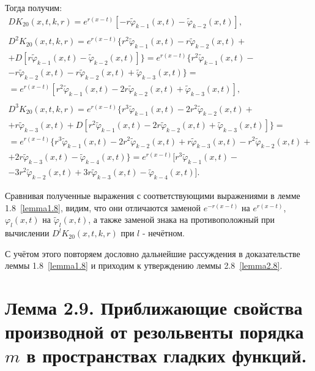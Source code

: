 Тогда получим:
\begin{equation}
\begin{array}{c}
\nonumber

DK_{20}(x,t,k,r) = e^{r(x-t)}[-r\widetilde\varphi_{k-1}(x,t) - \widetilde\varphi_{k-2}(x,t)], \\\\
D^2K_{20}(x,t,k,r) = e^{r(x-t)}\lbrace r^2\widetilde\varphi_{k-1}(x,t)-r\widetilde\varphi_{k-2}(x,t) + \\ + D[r\widetilde\varphi_{k-1}(x,t) - \widetilde\varphi_{k-2}(x,t)]\rbrace = e^{r(x-t)}\lbrace r^2\widetilde\varphi_{k-1}(x,t) - \\ - r\widetilde\varphi_{k-2}(x,t) - r\widetilde\varphi_{k-2}(x,t) + \widetilde\varphi_{k-3}(x,t)\rbrace = \\ = e^{r(x-t)}[r^2\widetilde\varphi_{k-1}(x,t) - 2r\widetilde\varphi_{k-2}(x,t) + \widetilde\varphi_{k-3}(x,t)], \\\\
D^3K_{20}(x,t,k,r) = e^{r(x-t)}\lbrace r^3\widetilde\varphi_{k-1}(x,t)-2r^2\widetilde\varphi_{k-2}(x,t) + \\ + r\widetilde\varphi_{k-3}(x,t) + D[r^2\widetilde\varphi_{k-1}(x,t) - 2r\widetilde\varphi_{k-2}(x,t) + \widetilde\varphi_{k-3}(x,t)]\rbrace = \\ = e^{r(x-t)}\lbrace r^3\widetilde\varphi_{k-1}(x,t)-2r^2\widetilde\varphi_{k-2}(x,t) + r\widetilde\varphi_{k-3}(x,t) - r^2\widetilde\varphi_{k-2}(x,t) + \\ + 2r\widetilde\varphi_{k-3}(x,t) - \widetilde\varphi_{k-4}(x,t)\rbrace = e^{r(x-t)}[r^3\widetilde\varphi_{k-1}(x,t) - \\ - 3r^2\widetilde\varphi_{k-2}(x,t) + 3r\widetilde\varphi_{k-3}(x,t) - \widetilde\varphi_{k-4}(x,t)].

\end{array}
\end{equation}

Сравнивая полученные выражения с соответствующими выражениями в лемме 1.8~\eqref{lemma1.8}, видим, что они отличаются заменой $ e^{-r(x-t)} $ на $ e^{r(x-t)} $, $ \varphi_l(x,t) $ на $ \widetilde\varphi_l(x,t) $, а также заменой знака на противоположный при вычислении $ D^lK_{20}(x,t,k,r) $ при $ l $ - нечётном.

С учётом этого повторяем дословно дальнейшие рассуждения в доказательстве леммы 1.8~\eqref{lemma1.8} и приходим к утверждению леммы 2.8~\eqref{lemma2.8}.

\section{Лемма 2.9. Приближающие свойства производной от резольвенты порядка $ m $ в пространствах гладких функций.}
\label{lemma2.9}

